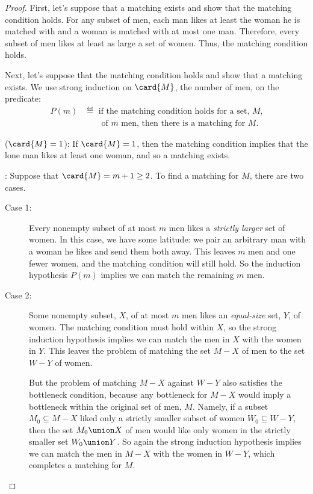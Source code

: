 \begin{proof}
  First, let's suppose that a matching exists and show that the matching
  condition holds.  For any subset of men, each man likes at least the
  woman he is matched with and a woman is matched with at most one man.
  Therefore, every subset of men likes at least as large a set of women.
  Thus, the matching condition holds.

Next, let's suppose that the matching condition holds and show that a
matching exists.  We use strong induction on $\card{M}$, the number of
men, on the predicate:
\begin{align*}
    P(m) & \eqdef \text{ if the matching condition holds for a set,~$M$,}\\
         &\qquad  \text{of~$m$ men, then there is a matching for~$M$.}
\end{align*}

 ($\card{M}=1$): If $\card{M} = 1$, then the
matching condition implies that the lone man likes at least one woman,
and so a matching exists.

: \iffalse
We need to show that $\forall k \le m.\, P(k) \QIMPLIES
P(m + 1)$.\fi  Suppose that $\card{M} = m + 1 \ge 2$.  To find a
matching for $M$, there are two cases.
\begin{description}

\item[Case 1:] Every nonempty subset of at most $m$ men likes a
  \emph{strictly larger} set of women.  In this case, we have some
  latitude: we pair an arbitrary man with a woman he likes and send
  them both away.  This leaves $m$ men and one fewer women, and the
  matching condition will still hold.  So the induction hypothesis
  $P(m)$ implies we can match the remaining $m$ men.

\item[Case 2:] Some nonempty subset, $X$, of at most $m$ men likes an
  \emph{equal-size} set, $Y$, of women.  The matching condition must
  hold within $X$, so the strong induction hypothesis implies we can
  match the men in $X$ with the women in $Y$.  This leaves the problem
  of matching the set $M-X$ of men to the set $W-Y$ of women.

  But the problem of matching $M-X$ against $W-Y$ also satisfies the
  bottleneck condition, because any bottleneck for $M-X$ would imply a
  bottleneck within the original set of men, $M$.  Namely, if a subset
  $M_0 \subseteq M-X$ liked only a strictly smaller subset of women
  $W_0 \subseteq W-Y$, then the set $M_0 \union X$ of men would like
  only women in the strictly smaller set $W_0 \union Y$.  So again the
  strong induction hypothesis implies we can match the men in $M-X$
  with the women in $W-Y$, which completes a matching for $M$.
  

\end{description}
\end{proof}
